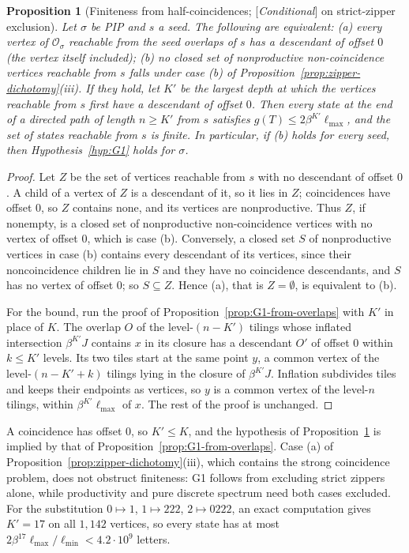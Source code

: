 \documentclass[11pt]{amsart}
\theoremstyle{plain}
\newtheorem{proposition}[theorem]{Proposition}
\theoremstyle{definition}
\theoremstyle{remark}
\newcommand{\PDS}{pure discrete spectrum}
\newcommand{\Status}[1]{\textup{[\textit{#1}]}}
\begin{document}
\begin{proposition}[Finiteness from half-coincidences; \Status{Conditional} on strict-zipper exclusion]\label{prop:G1-from-half-coincidences}
Let $\sigma$ be PIP and $s$ a seed. The following are equivalent: \textup{(a)} every vertex of $\mathcal O_\sigma$ reachable from the seed overlaps of $s$ has a descendant of offset $0$ (the vertex itself included); \textup{(b)} no closed set of nonproductive non-coincidence vertices reachable from $s$ falls under case \textup{(b)} of Proposition~\ref{prop:zipper-dichotomy}\textup{(iii)}. If they hold, let $K'$ be the largest depth at which the vertices reachable from $s$ first have a descendant of offset $0$. Then every state at the end of a directed path of length $n\ge K'$ from $s$ satisfies $g(T)\le2\beta^{K'}\ell_{\max}$, and the set of states reachable from $s$ is finite. In particular, if \textup{(b)} holds for every seed, then Hypothesis~\ref{hyp:G1} holds for $\sigma$.
\end{proposition}
\begin{proof}
Let $Z$ be the set of vertices reachable from $s$ with no descendant of offset $0$. A child of a vertex of $Z$ is a descendant of it, so it lies in $Z$; coincidences have offset $0$, so $Z$ contains none, and its vertices are nonproductive. Thus $Z$, if nonempty, is a closed set of nonproductive non-coincidence vertices with no vertex of offset $0$, which is case \textup{(b)}. Conversely, a closed set $S$ of nonproductive vertices in case \textup{(b)} contains every descendant of its vertices, since their noncoincidence children lie in $S$ and they have no coincidence descendants, and $S$ has no vertex of offset $0$; so $S\subseteq Z$. Hence \textup{(a)}, that is $Z=\emptyset$, is equivalent to \textup{(b)}.

For the bound, run the proof of Proposition~\ref{prop:G1-from-overlaps} with $K'$ in place of $K$. The overlap $O$ of the level-$(n-K')$ tilings whose inflated intersection $\beta^{K'}J$ contains $x$ in its closure has a descendant $O'$ of offset $0$ within $k\le K'$ levels. Its two tiles start at the same point $y$, a common vertex of the level-$(n-K'+k)$ tilings lying in the closure of $\beta^{K'}J$. Inflation subdivides tiles and keeps their endpoints as vertices, so $y$ is a common vertex of the level-$n$ tilings, within $\beta^{K'}\ell_{\max}$ of $x$. The rest of the proof is unchanged.
\end{proof}

A coincidence has offset $0$, so $K'\le K$, and the hypothesis of Proposition~\ref{prop:G1-from-half-coincidences} is implied by that of Proposition~\ref{prop:G1-from-overlaps}. Case \textup{(a)} of Proposition~\ref{prop:zipper-dichotomy}\textup{(iii)}, which contains the strong coincidence problem, does not obstruct finiteness: G1 follows from excluding strict zippers alone, while productivity and \PDS{} need both cases excluded. For the substitution $0\mapsto1$, $1\mapsto222$, $2\mapsto0222$, an exact computation gives $K'=17$ on all $1{,}142$ vertices, so every state has at most $2\beta^{17}\ell_{\max}/\ell_{\min}<4.2\cdot10^{9}$ letters.
\end{document}
